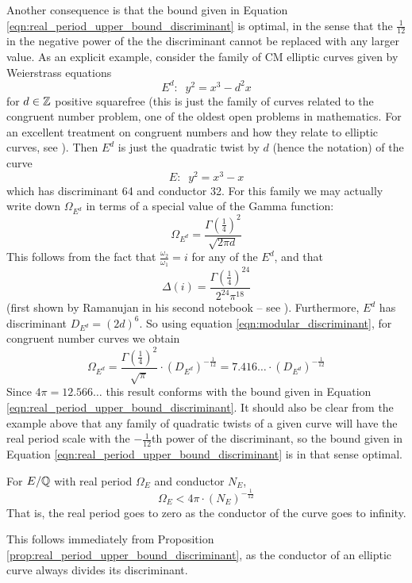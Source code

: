 \documentclass[10pt]{article}
\begin{document}
Another consequence is that the bound given in Equation \ref{eqn:real_period_upper_bound_discriminant} is optimal, in the sense that the $\frac{1}{12}$ in the negative power of the the discriminant cannot be replaced with any larger value. As an explicit example, consider the family of CM elliptic curves given by Weierstrass equations
\begin{equation}
E^d: \;\; y^2 = x^3 - d^2 x
\end{equation}
for $d \in\mathbb{Z}$ positive squarefree (this is just the family of curves related to the congruent number problem, one of the oldest open problems in mathematics. For an excellent treatment on congruent numbers and how they relate to elliptic curves, see \cite{Kob-2012}). Then $E^{d}$ is just the quadratic twist by $d$ (hence the notation) of the curve
\begin{equation}
E: \;\; y^2 = x^3-x
\end{equation}
which has discriminant 64 and conductor 32. For this family we may actually write down $\Omega_{E^d}$ in terms of a special value of the Gamma function:
\begin{equation}
\Omega_{E^d} = \frac{\Gamma(\frac{1}{4})^2}{\sqrt{2\pi d}}
\end{equation}
This follows from the fact that $\frac{\omega_2}{\omega_1} = i$ for any of the $E^d$, and that
\begin{equation}
\Delta(i) = \frac{\Gamma(\frac{1}{4})^{24}}{2^{24}\pi^{18}}
\end{equation}
(first shown by Ramanujan in his second notebook -- see \cite{BeZh-1992}). Furthermore, $E^{d}$ has discriminant $D_{E^{d}} = (2d)^6$. So using equation \ref{eqn:modular_discriminant}, for congruent number curves we obtain
\begin{equation}
\Omega_{E^d} = \frac{\Gamma(\frac{1}{4})^2}{\sqrt{\pi}} \cdot (D_{E^d})^{-\frac{1}{12}} = 7.416\ldots \cdot (D_{E^d})^{-\frac{1}{12}}
\end{equation}
Since $4\pi = 12.566\ldots$ this result conforms with the bound given in Equation \ref{eqn:real_period_upper_bound_discriminant}. It should also be clear from the example above that any family of quadratic twists of a given curve will have the real period scale with the $-\frac{1}{12}$th power of the discriminant, so the bound given in Equation \ref{eqn:real_period_upper_bound_discriminant} is in that sense optimal. \\

\begin{corollary}
For $E/\mathbb{Q}$ with real period $\Omega_E$ and conductor $N_E$,
\begin{equation}
\Omega_E < 4\pi \cdot (N_E)^{-\frac{1}{12}}
\end{equation}
That is, the real period goes to zero as the conductor of the curve goes to infinity.
\end{corollary}
This follows immediately from Proposition \ref{prop:real_period_upper_bound_discriminant}, as the conductor of an elliptic curve always divides its discriminant. \\
\end{document}
